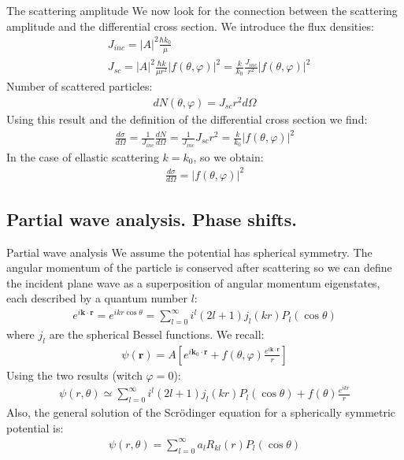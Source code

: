 \begin{frame}{The scattering amplitude}
We now look for the connection between the scattering amplitude and the differential cross section.
We introduce the flux densities:
\begin{align}
&J_{inc}=|A|^2 \frac{\hbar k_0}{\mu}\\
&J_{sc}=|A|^2 \frac{\hbar k}{\mu r^2}|f(\theta,\varphi)|^2=\frac{k}{k_0}\frac{J_{inc}}{r^2}|f(\theta,\varphi)|^2
\end{align}
Number of scattered particles:
\begin{align}
dN(\theta,\varphi)=J_{sc}r^2d\Omega
\end{align}
Using this result and the definition of the differential cross section we find:
\begin{align}
\frac{d\sigma}{d\Omega}=\frac{1}{J_{inc}}\frac{dN}{d\Omega}=\frac{1}{J_{inc}}J_{sc}r^2=\frac{k}{k_0}|f(\theta,\varphi)|^2
\end{align}
In the case of ellastic scattering $k=k_0$, so we obtain:
\begin{align}
\frac{d\sigma}{d\Omega}=|f(\theta,\varphi)|^2
\end{align}

\end{frame} 

\subsection{Partial wave analysis. Phase shifts.}
\begin{frame}{Partial wave analysis}
We assume the potential has spherical symmetry. The angular momentum of the particle is conserved after scattering so we can define the incident plane wave as a superposition of angular momentum eigenstates, each described by a quantum number $l$: 
\begin{align}
e^{i{\bm k}\cdot{\bm r}}=e^{ikr\cos\theta}=\sum_{l=0}^{\infty}i^l(2l+1)j_l(kr)P_l(\cos\theta) 
\end{align}
where $j_l$ are the spherical Bessel functions. We recall:
\begin{align}
\psi({\bm r})=A \left[ e^{i{\bm k_0}\cdot{\bm r}}+f(\theta,\varphi)\frac{e^{i{\bm k}\cdot{\bm r}}}{r}\right]
\end{align}
Using the two results (witch $\varphi=0$):
\begin{align}
\psi(r,\theta)\simeq\sum_{l=0}^{\infty}i^l(2l+1)j_l(kr)P_l(\cos\theta)+f(\theta)\frac{e^{ikr}}{r}
\end{align}
Also, the general solution of the Scr\"{o}dinger equation for a spherically symmetric potential is:
\begin{align}
\psi(r,\theta)=\sum_{l=0}^{\infty}a_lR_{kl}(r)P_l(\cos\theta) 
\end{align}
\end{frame} 

